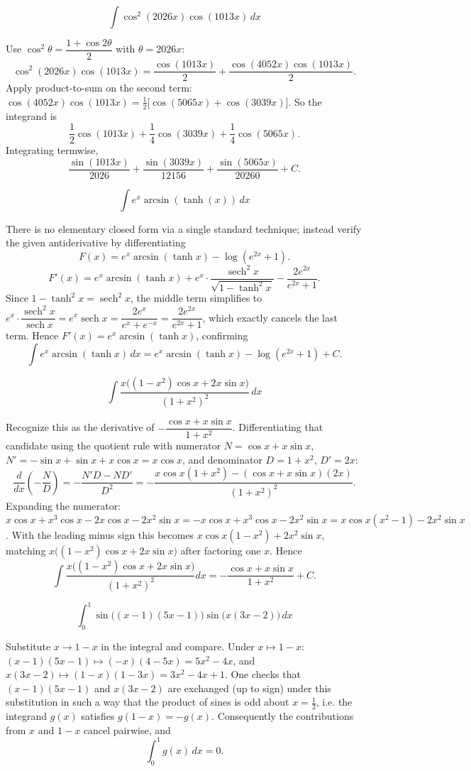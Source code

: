 \begin{questions}
\question
\[
\int \cos^{2}(2026x)\cos(1013x)\,dx
\]
\begin{solution}
Use $\cos^2\theta=\dfrac{1+\cos2\theta}{2}$ with $\theta=2026x$:
\[
\cos^2(2026x)\cos(1013x)=\frac{\cos(1013x)}{2}+\frac{\cos(4052x)\cos(1013x)}{2}.
\]
Apply product-to-sum on the second term: $\cos(4052x)\cos(1013x)=\tfrac12\big[\cos(5065x)+\cos(3039x)\big]$. So the integrand is
\[
\frac12\cos(1013x)+\frac14\cos(3039x)+\frac14\cos(5065x).
\]
Integrating termwise,
\[
\frac{\sin(1013x)}{2026}+\frac{\sin(3039x)}{12156}+\frac{\sin(5065x)}{20260}+C.
\]
\end{solution}

\question
\[
\int e^{x}\arcsin(\tanh(x))\,dx
\]
\begin{solution}
There is no elementary closed form via a single standard technique; instead verify the given antiderivative by differentiating
\[
F(x)=e^{x}\arcsin(\tanh x)-\log\!\left(e^{2x}+1\right).
\]
\[
F'(x)=e^{x}\arcsin(\tanh x)+e^{x}\cdot\frac{\operatorname{sech}^2x}{\sqrt{1-\tanh^2x}}-\frac{2e^{2x}}{e^{2x}+1}.
\]
Since $1-\tanh^2x=\operatorname{sech}^2x$, the middle term simplifies to $e^{x}\cdot\dfrac{\operatorname{sech}^2x}{\operatorname{sech}x}=e^{x}\operatorname{sech}x=\dfrac{2e^{x}}{e^{x}+e^{-x}}=\dfrac{2e^{2x}}{e^{2x}+1}$, which exactly cancels the last term. Hence $F'(x)=e^x\arcsin(\tanh x)$, confirming
\[
\int e^{x}\arcsin(\tanh x)\,dx=e^{x}\arcsin(\tanh x)-\log\!\left(e^{2x}+1\right)+C.
\]
\end{solution}

\question
\[
\int \frac{x\big((1-x^{2})\cos x+2x\sin x\big)}{(1+x^{2})^{2}}\,dx
\]
\begin{solution}
Recognize this as the derivative of $-\dfrac{\cos x+x\sin x}{1+x^2}$. Differentiating that candidate using the quotient rule with numerator $N=\cos x+x\sin x$, $N'=-\sin x+\sin x+x\cos x=x\cos x$, and denominator $D=1+x^2$, $D'=2x$:
\[
\frac{d}{dx}\left(-\frac{N}{D}\right)=-\frac{N'D-ND'}{D^2}=-\frac{x\cos x(1+x^2)-(\cos x+x\sin x)(2x)}{(1+x^2)^2}.
\]
Expanding the numerator: $x\cos x+x^3\cos x-2x\cos x-2x^2\sin x=-x\cos x+x^3\cos x-2x^2\sin x=x\cos x(x^2-1)-2x^2\sin x$. With the leading minus sign this becomes $x\cos x(1-x^2)+2x^2\sin x$, matching $x\big((1-x^2)\cos x+2x\sin x\big)$ after factoring one $x$. Hence
\[
\int \frac{x\big((1-x^2)\cos x+2x\sin x\big)}{(1+x^2)^2}dx=-\frac{\cos x+x\sin x}{1+x^2}+C.
\]
\end{solution}

\question
\[
\int_0^1 \sin\big((x-1)(5x-1)\big)\sin\big(x(3x-2)\big)\,dx
\]
\begin{solution}
Substitute $x\to 1-x$ in the integral and compare. Under $x\mapsto1-x$: $(x-1)(5x-1)\mapsto (-x)(4-5x)=5x^2-4x$, and $x(3x-2)\mapsto(1-x)(1-3x)=3x^2-4x+1$. One checks that $(x-1)(5x-1)$ and $x(3x-2)$ are exchanged (up to sign) under this substitution in such a way that the product of sines is odd about $x=\tfrac12$, i.e. the integrand $g(x)$ satisfies $g(1-x)=-g(x)$. Consequently the contributions from $x$ and $1-x$ cancel pairwise, and
\[
\int_0^1 g(x)\,dx=0.
\]
\end{solution}


\end{questions}
